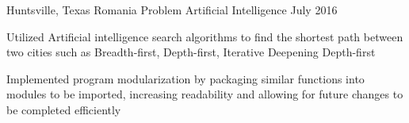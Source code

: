 
\begin{cventries}
	\cventry
	  {Huntsville, Texas} %
      {Romania Problem} %
	  {Artificial Intelligence} %
	  {July 2016} %
	  {
	    \begin{cvitems} %
			\item {Utilized Artificial intelligence search algorithms to find the shortest path between two cities such as Breadth-first, Depth-first, Iterative Deepening Depth-first}
			\item{Implemented program modularization by packaging similar functions into modules to be imported, increasing readability and allowing for future changes to be completed efficiently}				
		\end{cvitems}
	  }




\end{cventries}
